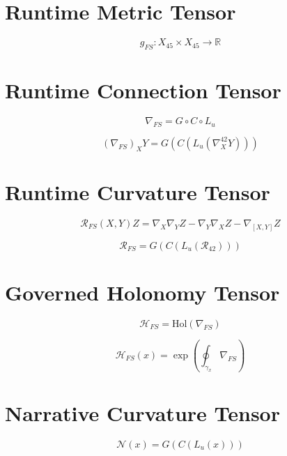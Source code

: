 
\section*{Runtime Metric Tensor}

\[
g_{FS} : X_{45} \times X_{45} \to \mathbb{R}
\]


\section*{Runtime Connection Tensor}

\[
\nabla_{FS} = G \circ C \circ L_u
\]

\[
(\nabla_{FS})_X Y
= G(C(L_u(\nabla^{42}_X Y)))
\]


\section*{Runtime Curvature Tensor}

\[
\mathcal{R}_{FS}(X,Y)Z
= \nabla_X \nabla_Y Z
- \nabla_Y \nabla_X Z
- \nabla_{[X,Y]} Z
\]

\[
\mathcal{R}_{FS}
= G(C(L_u(\mathcal{R}_{42})))
\]


\section*{Governed Holonomy Tensor}

\[
\mathcal{H}_{FS}
= \mathrm{Hol}(\nabla_{FS})
\]

\[
\mathcal{H}_{FS}(x)
= \exp\left( \oint_{\gamma_x} \nabla_{FS} \right)
\]


\section*{Narrative Curvature Tensor}

\[
\mathcal{N}(x)
= G(C(L_u(x)))
\]

